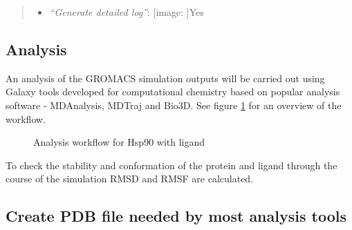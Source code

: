 \documentclass[twocolumn]{bmcart}%
\def\texttt{[image: ]}
\providecommand{\tightlist}{%
  \setlength{\itemsep}{0pt}\setlength{\parskip}{0pt}}
\begin{document}
\begin{quote}
\begin{enumerate}
\begin{itemize}
\begin{itemize}
      \begin{itemize}
      \tightlist
      \item
        \emph{``Temperature /K''}: \texttt{300}
      \item
        \emph{``Step length in ps''}: \texttt{0.001}
      \item
        \emph{``Number of steps that elapse between saving data points
        (velocities, forces, energies)''}: \texttt{1000}
      \item
        \emph{``Number of steps for the simulation''}: \texttt{1000000}
      \end{itemize}
    \end{itemize}
  \item
    \emph{``Generate detailed log''}: \texttt{Yes}
  \end{itemize}
\end{enumerate}


\end{quote}

\hypertarget{analysis}{%
\subsection*{Analysis}\label{analysis}}

An analysis of the GROMACS simulation outputs will be carried out using Galaxy tools developed for computational chemistry\cite{senapathi_biomolecular_2019} based on popular analysis software - MDAnalysis\cite{michaudagrawal_mdanalysis_2011}, MDTraj\cite{mcgibbon_mdtraj_2015} and Bio3D\cite{skjaerven_integrating_2014}. See figure \ref{fig:analysisworkflow} for an overview of the workflow. 

\begin{figure}[h!]
\caption{
    Analysis workflow for Hsp90 with ligand}
\centering
\label{fig:analysisworkflow}
\end{figure}

To check the stability and conformation of the protein and ligand through the course of the simulation RMSD and RMSF are calculated. 




\hypertarget{create-pdb-file-needed-by-most-analysis-tools}{%
\subsection{Create PDB file needed by most analysis
tools}\label{create-pdb-file-needed-by-most-analysis-tools}}
\end{document}
